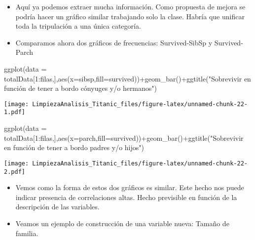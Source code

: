 \documentclass[
]{article}
\newenvironment{Shaded}{\begin{snugshade}}{\end{snugshade}}
\newcommand{\AttributeTok}[1]{\textcolor[rgb]{0.80,0.80,0.80}{#1}}
\newcommand{\DecValTok}[1]{\textcolor[rgb]{0.86,0.86,0.80}{#1}}
\newcommand{\FunctionTok}[1]{\textcolor[rgb]{0.94,0.94,0.56}{#1}}
\newcommand{\NormalTok}[1]{\textcolor[rgb]{0.80,0.80,0.80}{#1}}
\newcommand{\SpecialCharTok}[1]{\textcolor[rgb]{0.86,0.64,0.64}{#1}}
\newcommand{\StringTok}[1]{\textcolor[rgb]{0.80,0.58,0.58}{#1}}
\begin{document}
\begin{itemize}
\item
  Aquí ya podemos extraer mucha información. Como propuesta de mejora se
  podría hacer un gráfico similar trabajando solo la clase. Habría que
  unificar toda la tripulación a una única categoría.
\item
  Comparamos ahora dos gráficos de frecuencias: Survived-SibSp y
  Survived-Parch
\end{itemize}

\begin{Shaded}
\begin{Highlighting}[]
\FunctionTok{ggplot}\NormalTok{(}\AttributeTok{data =}\NormalTok{ totalData[}\DecValTok{1}\SpecialCharTok{:}\NormalTok{filas,],}\FunctionTok{aes}\NormalTok{(}\AttributeTok{x=}\NormalTok{sibsp,}\AttributeTok{fill=}\NormalTok{survived))}\SpecialCharTok{+}\FunctionTok{geom\_bar}\NormalTok{()}\SpecialCharTok{+}\FunctionTok{ggtitle}\NormalTok{(}\StringTok{"Sobrevivir en función de tener a bordo cónyuges y/o hermanos"}\NormalTok{)}
\end{Highlighting}
\end{Shaded}

\texttt{[image: LimpiezaAnalisis\_Titanic\_files/figure-latex/unnamed-chunk-22-1.pdf]}

\begin{Shaded}
\begin{Highlighting}[]
\FunctionTok{ggplot}\NormalTok{(}\AttributeTok{data =}\NormalTok{ totalData[}\DecValTok{1}\SpecialCharTok{:}\NormalTok{filas,],}\FunctionTok{aes}\NormalTok{(}\AttributeTok{x=}\NormalTok{parch,}\AttributeTok{fill=}\NormalTok{survived))}\SpecialCharTok{+}\FunctionTok{geom\_bar}\NormalTok{()}\SpecialCharTok{+}\FunctionTok{ggtitle}\NormalTok{(}\StringTok{"Sobrevivir en función de tener a bordo padres y/o hijos"}\NormalTok{)}
\end{Highlighting}
\end{Shaded}

\texttt{[image: LimpiezaAnalisis\_Titanic\_files/figure-latex/unnamed-chunk-22-2.pdf]}

\begin{itemize}
\item
  Vemos como la forma de estos dos gráficos es similar. Este hecho nos
  puede indicar presencia de correlaciones altas. Hecho previsible en
  función de la descripción de las variables.
\item
  Veamos un ejemplo de construcción de una variable nueva: Tamaño de
  familia.
\end{itemize}
\end{document}
